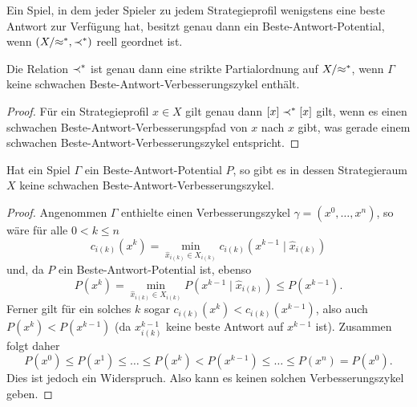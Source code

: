 \begin{satz}\label{satz:CharExBAPot}
	Ein Spiel, in dem jeder Spieler zu jedem Strategieprofil wenigstens eine beste Antwort zur Verfügung hat, besitzt genau dann ein Beste-Antwort-Potential, wenn  $(X/{\approx^\ast}, \prec^\ast)$ reell geordnet ist.
\end{satz}

\begin{prop}\label{prop:BARelPartOrdVerbz}
	Die Relation $\prec^\ast$ ist genau dann eine strikte Partialordnung auf $X/{\approx^\ast}$, wenn $\Gamma$ keine schwachen Beste-Antwort-Verbesserungszykel enthält.
\end{prop}

\begin{proof}
	Für ein Strategieprofil $x \in X$ gilt genau dann $[x] \prec^\ast [x]$ gilt, wenn es einen schwachen Beste-Antwort-Verbesserungspfad von $x$ nach $x$ gibt, was gerade einem schwachen Beste-Antwort-Verbesserungszykel entspricht.
\end{proof}

\begin{prop}\label{prop:BAPotKeineschwBAVBZ}
	Hat ein Spiel $\Gamma$ ein Beste-Antwort-Potential $P$, so gibt es in dessen Strategieraum $X$ keine schwachen Beste-Antwort-Verbesserungszykel.
\end{prop}

\begin{proof}
	Angenommen $\Gamma$ enthielte einen Verbesserungszykel $\gamma = (x^0, \dots, x^n)$, so wäre für alle $0 < k \leq n$
		\[c_{i(k)}(x^k) = \min_{\hat{x}_{i(k)} \in X_{i(k)}} c_{i(k)}(x^{k-1} \mid \hat{x}_{i(k)})\]
	und, da $P$ ein Beste-Antwort-Potential ist, ebenso 
		\[P(x^k) = \min_{\hat{x}_{i(k)} \in X_{i(k)}} P(x^{k-1} \mid \hat{x}_{i(k)}) \leq P(x^{k-1}).\]
	Ferner gilt für ein solches $k$ sogar $c_{i(k)}(x^k) < c_{i(k)}(x^{k-1})$, also auch $P(x^k) < P(x^{k-1})$ (da $x^{k-1}_{i(k)}$ keine beste Antwort auf $x^{k-1}$ ist). Zusammen folgt daher
		\[P(x^0) \leq P(x^1) \leq \dots \leq P(x^k) < P(x^{k-1}) \leq \dots \leq P(x^n) = P(x^0).\]
	Dies ist jedoch ein Widerspruch. Also kann es keinen solchen Verbesserungszykel geben.
\end{proof}


